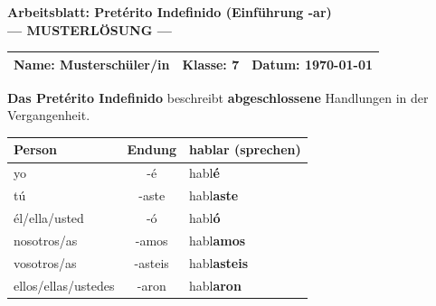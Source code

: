 \documentclass[11pt, a4paper]{article}
\newcommand{\fachfarbe}{spanisch}
\newcommand{\thema}{Pretérito Indefinido (Einführung -ar)}
\newcommand{\klasse}{7}
\newcommand{\datum}{\today}
\newcommand{\loesung}[1]{\textcolor{loesung}{\textbf{#1}}}
\begin{document}

\begin{center}
    {\Large\bfseries\textcolor{\fachfarbe}{Arbeitsblatt: \thema}}\\[0.3em]
    {\large\textcolor{loesung}{\textbf{--- MUSTERLÖSUNG ---}}}
\end{center}

\vspace{5pt}

\noindent
\begin{tabularx}{\textwidth}{|X|X|X|}
\hline
\textbf{Name:} \textcolor{loesung}{Musterschüler/in} &
\textbf{Klasse:} \klasse &
\textbf{Datum:} \datum \\
\hline
\end{tabularx}

\vspace{15pt}


\begin{merkkasten}
\textbf{Das Pretérito Indefinido} beschreibt \textbf{abgeschlossene} Handlungen in der Vergangenheit.

\vspace{0.5em}

\begin{center}
\begin{tabular}{|l|c|l|}
\hline
\textbf{Person} & \textbf{Endung} & \textbf{hablar (sprechen)} \\
\hline
yo & -é & habl\loesung{é} \\
tú & -aste & habl\loesung{aste} \\
él/ella/usted & -ó & habl\loesung{ó} \\
nosotros/as & -amos & habl\loesung{amos} \\
vosotros/as & -asteis & habl\loesung{asteis} \\
ellos/ellas/ustedes & -aron & habl\loesung{aron} \\
\hline
\end{tabular}
\end{center}

\end{merkkasten}

\vspace{10pt}
\end{document}

